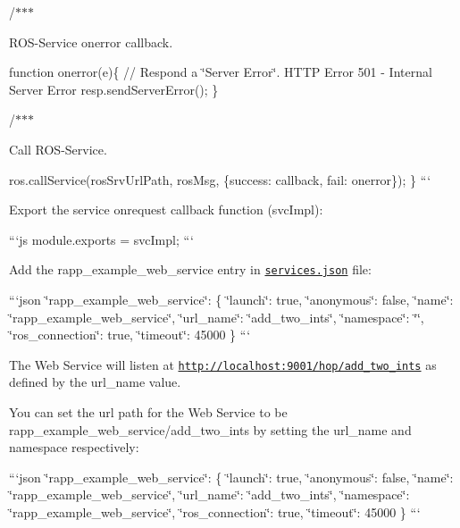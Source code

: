 /$\ast$$\ast$$\ast$
\begin{DoxyItemize}
\item R\-O\-S-\/\-Service onerror callback.
\end{DoxyItemize}

function onerror(e)\{ // Respond a \char`\"{}\-Server Error\char`\"{}. H\-T\-T\-P Error 501 -\/ Internal Server Error resp.\-send\-Server\-Error(); \}

/$\ast$$\ast$$\ast$
\begin{DoxyItemize}
\item Call R\-O\-S-\/\-Service.
\end{DoxyItemize}

ros.\-call\-Service(ros\-Srv\-Url\-Path, ros\-Msg, \{success\-: callback, fail\-: onerror\}); \} ```

Export the service onrequest callback function (svc\-Impl)\-:

```js module.\-exports = svc\-Impl; ```

Add the {\ttfamily rapp\-\_\-example\-\_\-web\-\_\-service} entry in \href{https://github.com/rapp-project/rapp-platform/blob/master/rapp_web_services/config/services/services.json}{\tt services.\-json} file\-:

```json \char`\"{}rapp\-\_\-example\-\_\-web\-\_\-service\char`\"{}\-: \{ \char`\"{}launch\char`\"{}\-: true, \char`\"{}anonymous\char`\"{}\-: false, \char`\"{}name\char`\"{}\-: \char`\"{}rapp\-\_\-example\-\_\-web\-\_\-service\char`\"{}, \char`\"{}url\-\_\-name\char`\"{}\-: \char`\"{}add\-\_\-two\-\_\-ints\char`\"{}, \char`\"{}namespace\char`\"{}\-: \char`\"{}\char`\"{}, \char`\"{}ros\-\_\-connection\char`\"{}\-: true, \char`\"{}timeout\char`\"{}\-: 45000 \} ```

The Web Service will listen at {\ttfamily \href{http://localhost:9001/hop/add_two_ints}{\tt http\-://localhost\-:9001/hop/add\-\_\-two\-\_\-ints}} as defined by the {\ttfamily url\-\_\-name} value.

You can set the url path for the Web Service to be {\ttfamily rapp\-\_\-example\-\_\-web\-\_\-service/add\-\_\-two\-\_\-ints} by setting the url\-\_\-name and namespace respectively\-:

```json \char`\"{}rapp\-\_\-example\-\_\-web\-\_\-service\char`\"{}\-: \{ \char`\"{}launch\char`\"{}\-: true, \char`\"{}anonymous\char`\"{}\-: false, \char`\"{}name\char`\"{}\-: \char`\"{}rapp\-\_\-example\-\_\-web\-\_\-service\char`\"{}, \char`\"{}url\-\_\-name\char`\"{}\-: \char`\"{}add\-\_\-two\-\_\-ints\char`\"{}, \char`\"{}namespace\char`\"{}\-: \char`\"{}rapp\-\_\-example\-\_\-web\-\_\-service\char`\"{}, \char`\"{}ros\-\_\-connection\char`\"{}\-: true, \char`\"{}timeout\char`\"{}\-: 45000 \} ```

